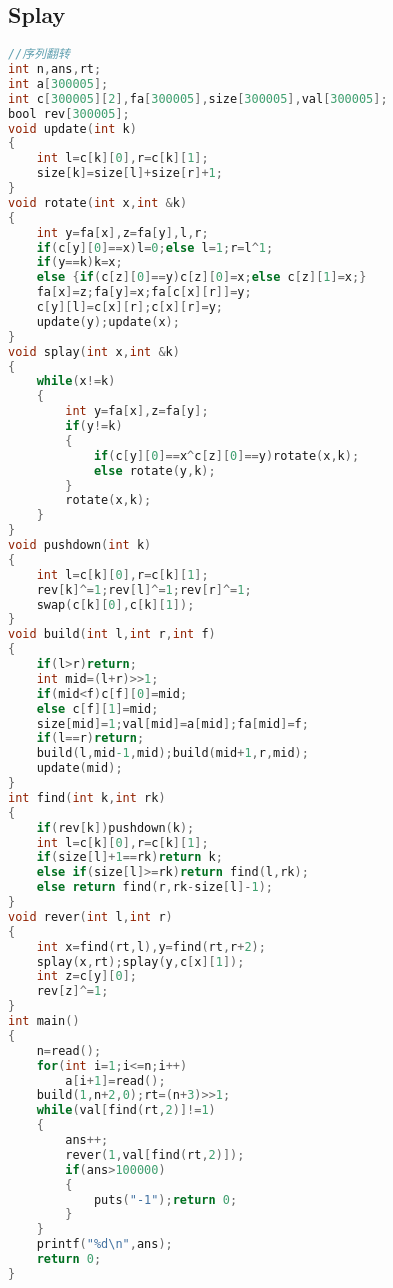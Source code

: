\subsection{Splay}
\begin{lstlisting}[language=C] 
//序列翻转
int n,ans,rt;
int a[300005];
int c[300005][2],fa[300005],size[300005],val[300005];
bool rev[300005];
void update(int k)
{
	int l=c[k][0],r=c[k][1];
	size[k]=size[l]+size[r]+1;
}
void rotate(int x,int &k)
{
	int y=fa[x],z=fa[y],l,r;
	if(c[y][0]==x)l=0;else l=1;r=l^1;
	if(y==k)k=x;
	else {if(c[z][0]==y)c[z][0]=x;else c[z][1]=x;}
	fa[x]=z;fa[y]=x;fa[c[x][r]]=y;
	c[y][l]=c[x][r];c[x][r]=y;
	update(y);update(x);
}
void splay(int x,int &k)
{
	while(x!=k)
	{
		int y=fa[x],z=fa[y];
		if(y!=k)
		{
			if(c[y][0]==x^c[z][0]==y)rotate(x,k);
			else rotate(y,k);
		}
		rotate(x,k);
	}
}
void pushdown(int k)
{
	int l=c[k][0],r=c[k][1];
	rev[k]^=1;rev[l]^=1;rev[r]^=1;
	swap(c[k][0],c[k][1]);
}
void build(int l,int r,int f)
{
	if(l>r)return;
	int mid=(l+r)>>1;
	if(mid<f)c[f][0]=mid;
	else c[f][1]=mid;
	size[mid]=1;val[mid]=a[mid];fa[mid]=f;
	if(l==r)return;
	build(l,mid-1,mid);build(mid+1,r,mid);
	update(mid);
}
int find(int k,int rk)
{
	if(rev[k])pushdown(k);
	int l=c[k][0],r=c[k][1];
	if(size[l]+1==rk)return k;
	else if(size[l]>=rk)return find(l,rk);
	else return find(r,rk-size[l]-1);
}
void rever(int l,int r)
{
	int x=find(rt,l),y=find(rt,r+2);
	splay(x,rt);splay(y,c[x][1]);
	int z=c[y][0];
	rev[z]^=1;
}
int main()
{
	n=read();
	for(int i=1;i<=n;i++)
		a[i+1]=read();
	build(1,n+2,0);rt=(n+3)>>1;
	while(val[find(rt,2)]!=1)
	{
		ans++;
		rever(1,val[find(rt,2)]);
		if(ans>100000)
		{
			puts("-1");return 0;
		}
	}
	printf("%d\n",ans);
	return 0;
}
\end{lstlisting}
